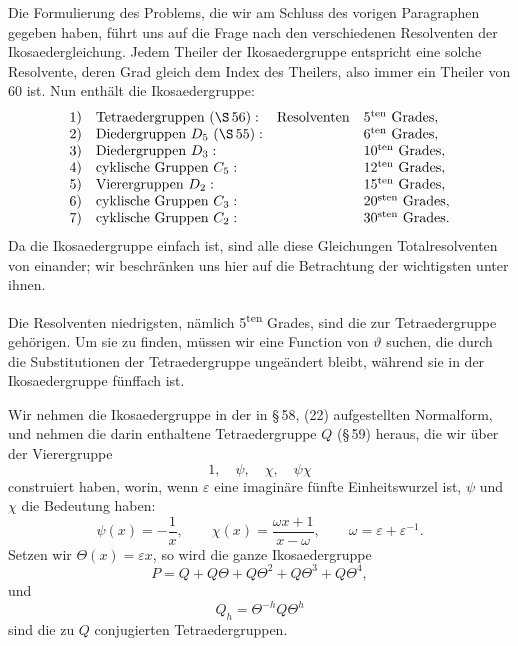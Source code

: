 \documentclass[11pt]{article}
\providecommand{\eps}{\varepsilon}
\providecommand{\eps}{\varepsilon}
\begin{document}
Die Formulierung des Problems, die wir am Schluss des vorigen Paragraphen gegeben haben, führt uns auf die Frage nach den verschiedenen Resolventen der Ikosaedergleichung. Jedem Theiler der Ikosaedergruppe entspricht eine solche Resolvente, deren Grad gleich dem Index des Theilers, also immer ein Theiler von 60 ist. Nun enthält die Ikosaedergruppe:
\[
\begin{array}{rlcl}
1)&\text{Tetraedergruppen }(\S\,56):&\text{Resolventen}&5^{\rm ten}\text{ Grades},\\
2)&\text{Diedergruppen }D_5\ (\S\,55):&&6^{\rm ten}\text{ Grades},\\
3)&\text{Diedergruppen }D_3:&&10^{\rm ten}\text{ Grades},\\
4)&\text{cyklische Gruppen }C_5:&&12^{\rm ten}\text{ Grades},\\
5)&\text{Vierergruppen }D_2:&&15^{\rm ten}\text{ Grades},\\
6)&\text{cyklische Gruppen }C_3:&&20^{\rm sten}\text{ Grades},\\
7)&\text{cyklische Gruppen }C_2:&&30^{\rm sten}\text{ Grades}.
\end{array}
\]
Da die Ikosaedergruppe einfach ist, sind alle diese Gleichungen Totalresolventen von einander; wir beschränken uns hier auf die Betrachtung der wichtigsten unter ihnen.

Die Resolventen niedrigsten, nämlich 5\textsuperscript{ten} Grades, sind die zur Tetraedergruppe gehörigen. Um sie zu finden, müssen wir eine Function von \(\vartheta\) suchen, die durch die Substitutionen der Tetraedergruppe ungeändert bleibt, während sie in der Ikosaedergruppe fünffach ist.

Wir nehmen die Ikosaedergruppe in der in \S\,58, (22) aufgestellten Normalform, und nehmen die darin enthaltene Tetraedergruppe \(Q\) (\S\,59) heraus, die wir über der Vierergruppe
\begin{equation}
1,\quad \psi,\quad \chi,\quad \psi\chi
\tag{1}
\end{equation}
construiert haben, worin, wenn \(\eps\) eine imaginäre fünfte Einheitswurzel ist, \(\psi\) und \(\chi\) die Bedeutung haben:
\begin{equation}
\psi(x)=-\frac1x,\qquad \chi(x)=\frac{\omega x+1}{x-\omega},\qquad \omega=\eps+\eps^{-1}.
\tag{2}
\end{equation}
Setzen wir \(\Theta(x)=\eps x\), so wird die ganze Ikosaedergruppe
\begin{equation}
P=Q+Q\Theta+Q\Theta^2+Q\Theta^3+Q\Theta^4,
\tag{3}
\end{equation}
und
\begin{equation}
Q_h=\Theta^{-h}Q\Theta^h
\tag{4}
\end{equation}
sind die zu \(Q\) conjugierten Tetraedergruppen.
\end{document}
